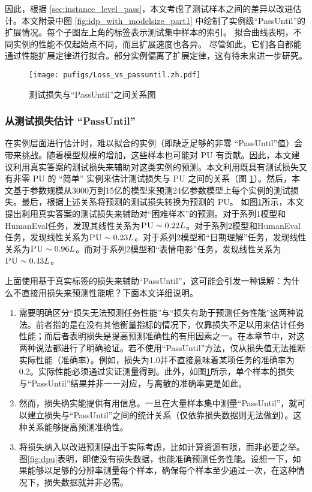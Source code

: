 因此，根据 \ref{sec:instance_level_pass}，本文考虑了测试样本之间的差异以改进估计。本文附录中图 \ref{fig:idp_with_modelsize_part1} 中绘制了实例级“PassUntil”的扩展情况。每个子图左上角的标签表示测试集中样本的索引。
拟合曲线表明，不同实例的性能不仅起始点不同，而且扩展速度也各异。
尽管如此，它们各自都能通过性能扩展定律进行拟合。部分实例偏离了扩展定律，这有待未来进一步研究。 


\begin{figure}[!htbp]
    \centering
    \texttt{[image: pufigs/Loss\_vs\_passuntil.zh.pdf]}
    \caption{测试损失与“PassUntil”之间关系图}
\label{fig:loss_vs_passuntil}
\end{figure}

\subsubsection{从测试损失估计 “PassUntil”}

在实例层面进行估计时，难以拟合的实例（即缺乏足够的非零 “PassUntil”值）会带来挑战。随着模型规模的增加，这些样本也可能对 \textsc{PU} 有贡献。因此，本文建议利用真实答案的测试损失来辅助对这类实例的预测。本文利用既具有测试损失又有非零 \textsc{PU} 的 “简单” 实例来估计测试损失与 \textsc{PU} 之间的关系（图 \ref{fig:loss_vs_passuntil}）。然后，本文基于参数规模从3000万到15亿的模型来预测24亿参数模型上每个实例的测试损失。最后，根据上述关系将预测的测试损失转换为预测的 \textsc{PU}。
如图\ref{fig:loss_vs_passuntil}所示，本文提出利用真实答案的测试损失来辅助对“困难样本”的预测。对于系列1模型和HumanEval任务，发现其线性关系为\(\textsc{PU} \sim 0.22L\)。对于系列2模型和HumanEval任务，发现线性关系为\(\textsc{PU} \sim 0.23L\)。对于系列2模型和“日期理解”任务，发现线性关系为\(\textsc{PU} \sim 0.96L\)。而对于系列2模型和“表情电影”任务，发现线性关系为\(\textsc{PU} \sim 0.43L\)。 

上面使用基于真实标签的损失来辅助“PassUntil”，这可能会引发一种误解：为什么不直接用损失来预测性能呢？下面本文详细说明。
\begin{enumerate}
    \item {需要明确区分“损失无法预测任务性能”与“损失有助于预测任务性能”这两种说法。前者指的是在没有其他衡量指标的情况下，仅靠损失不足以用来估计任务性能；而后者表明损失是提高预测准确性的有用因素之一。在本章节中，对这两种说法都进行了明确验证。若不使用“PassUntil”方法，仅从损失值无法推断实际性能（准确率）。例如，损失为1.0并不直接意味着某项任务的准确率为0.2。实际性能必须通过实证测量得到。此外，如图\ref{fig:loss_vs_passuntil}所示，单个样本的损失与“PassUntil”结果并非一一对应，与离散的准确率更是如此。}
    \item {然而，损失确实能提供有用信息。一旦在大量样本集中测量“PassUntil”，就可以建立损失与“PassUntil”之间的统计关系（仅依靠损失数据则无法做到）。这种关系能够提高预测准确性。}
    \item {将损失纳入以改进预测是出于实际考虑，比如计算资源有限，而非必要之举。图\ref{fig:dpu}表明，即使没有损失数据，也能准确预测任务性能。设想一下，如果能够以足够的分辨率测量每个样本，确保每个样本至少通过一次，在这种情况下，损失数据就并非必需。}
\end{enumerate}


